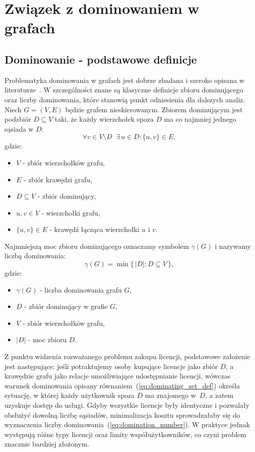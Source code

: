 \chapter{Związek z dominowaniem w grafach}
\label{chap:roman_domination}
\section{Dominowanie - podstawowe definicje}
Problematyka dominowania w grafach jest dobrze zbadana i szeroko opisana w literaturze~\cite{haynes1998domination}.
W szczególności znane są klasyczne definicje zbioru dominującego oraz liczby dominowania, które stanowią punkt odniesienia dla dalszych analiz.
Niech $G=(V,E)$ będzie grafem nieskierowanym.
Zbiorem dominującym jest podzbiór $D \subseteq V$ taki, że każdy wierzchołek spoza $D$ ma co najmniej jednego sąsiada w $D$:
\begin{equation}
  \forall v \in V \setminus D \;\; \exists\, u \in D : \{u,v\} \in E ,
  \label{eq:dominating_set_def}
\end{equation}
gdzie:
\begin{itemize}
  \item $V$ - zbiór wierzchołków grafu,
  \item $E$ - zbiór krawędzi grafu,
  \item $D \subseteq V$ - zbiór dominujący,
  \item $u,v \in V$ - wierzchołki grafu,
  \item $\{u,v\}\in E$ - krawędź łącząca wierzchołki $u$ i $v$.
\end{itemize}


Najmniejszą moc zbioru dominującego oznaczamy symbolem $\gamma(G)$ i nazywamy liczbą dominowania:
\begin{equation}
  \gamma(G) = \min \{\, |D| : D \subseteq V \,\},
  \label{eq:domination_number}
\end{equation}
gdzie:
\begin{itemize}
  \item $\gamma(G)$ - liczba dominowania grafu $G$,
  \item $D$ - zbiór dominujący w grafie $G$,
  \item $V$ - zbiór wierzchołków grafu,
  \item $|D|$ - moc zbioru $D$.
\end{itemize}



Z punktu widzenia rozważanego problemu zakupu licencji, podstawowe założenie jest następujące:
jeśli potraktujemy osoby kupujące licencje jako zbiór \(D\), a krawędzie grafu jako relacje
umożliwiające udostępnianie licencji, wówczas warunek dominowania opisany równaniem~(\ref{eq:dominating_set_def}) określa sytuację,
w której każdy użytkownik spoza $D$ ma znajomego w~$D$, a zatem uzyskuje dostęp do usługi.
Gdyby wszystkie licencje były identyczne i pozwalały obsłużyć dowolną liczbę sąsiadów,
minimalizacja kosztu sprowadzałaby się do wyznaczenia liczby dominowania~(\ref{eq:domination_number}).
W praktyce jednak występują różne typy licencji oraz limity
współużytkowników, co czyni problem znacznie bardziej złożonym.

